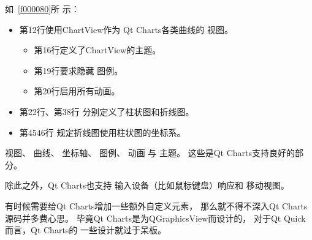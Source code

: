 如\filesourcenumbernameone\ \ref{f000080}所
示：
\begin{itemize}
\item 第12行使用ChartView作为
Qt Charts各类曲线的
视图。
    \begin{itemize}
\item 第16行定义了ChartView的主题。
\item 第19行要求隐藏
图例。
\item 第20行启用所有动画。
    \end{itemize}
\item 第22行、第38行
分别定义了柱状图和折线图。
\item 第45\raisebox{0.16ex}{\sourcefonttwo\~{}}46行
规定折线图使用柱状图的坐标系。

\end{itemize}

视图、
曲线、
坐标轴、
图例、
动画
与
主题。
这些是Qt Charts支持良好的部分。

除此之外，Qt Charts也支持
输入设备（比如鼠标键盘）响应和
移动视图。

有时候需要给Qt Charts增加一些额外自定义元素，
那么就不得不深入Qt Charts源码并多费心思。
毕竟Qt Charts是为QGraphicsView而设计的，
对于Qt Quick而言，Qt Charts的
一些设计就过于呆板。












